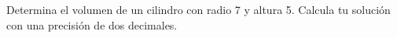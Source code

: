 \begin{question}
\begin{instance}
\begin{mcq}[standalone=true]
\begin{stem}
Determina el volumen de un cilindro con radio 7 y altura 5. Calcula tu solución con una precisión de dos decimales.\par

\end{stem}
\begin{distractors}

\end{distractors}

\end{mcq}

\end{instance}

\end{question}
